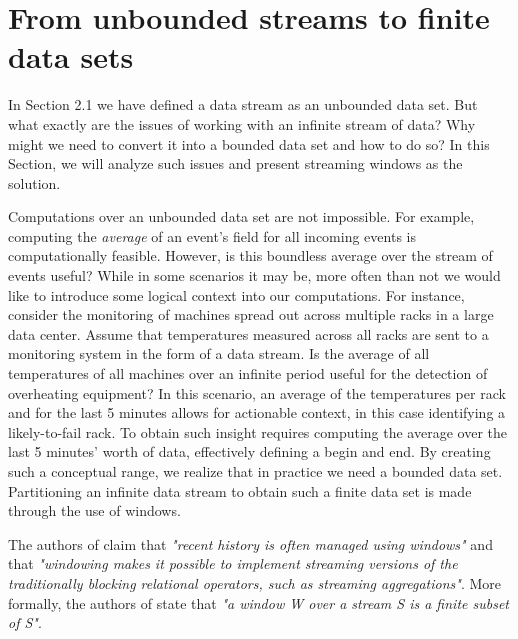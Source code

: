 
\section{From unbounded streams to finite data sets} \label{sec:windows}

In Section 2.1 we have defined a data stream as an unbounded data set. But what exactly are the issues of working with an infinite stream of data? Why might we need to convert it into a bounded data set and how to do so? In this Section, we will analyze such issues and present streaming windows as the solution.

Computations over an unbounded data set are not impossible. For example, computing the \textit{average} of an event's field for all incoming events is computationally feasible. However, is this boundless average over the stream of events useful? While in some scenarios it may be, more often than not we would like to introduce some logical context into our computations. For instance, consider the monitoring of machines spread out across multiple racks in a large data center. Assume that temperatures measured across all racks are sent to a monitoring system in the form of a data stream. Is the average of all temperatures of all machines over an infinite period useful for the detection of overheating equipment? In this scenario, an average of the temperatures per rack and for the last 5 minutes allows for actionable context, in this case identifying a likely-to-fail rack. To obtain such insight requires computing the average over the last 5 minutes' worth of data, effectively defining a begin and end. By creating such a conceptual range, we realize that in practice we need a bounded data set. Partitioning an infinite data stream to obtain such a finite data set is made through the use of windows.

The authors of \cite{Wang-Windows-Stream-Processing} claim that \textit{"recent history is often managed using windows"} and that \textit{"windowing makes it possible to implement streaming versions of the traditionally blocking relational operators, such as streaming aggregations"}. More formally, the authors of \cite{Botan-SECRET} state that \textit{"a window W over a stream S is a finite subset of S"}.

